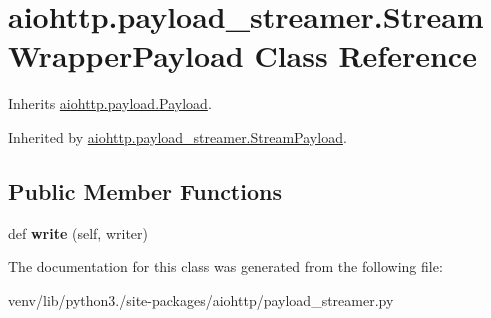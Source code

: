 \hypertarget{classaiohttp_1_1payload__streamer_1_1_stream_wrapper_payload}{}\section{aiohttp.\+payload\+\_\+streamer.\+Stream\+Wrapper\+Payload Class Reference}
\label{classaiohttp_1_1payload__streamer_1_1_stream_wrapper_payload}


Inherits \hyperlink{classaiohttp_1_1payload_1_1_payload}{aiohttp.\+payload.\+Payload}.



Inherited by \hyperlink{classaiohttp_1_1payload__streamer_1_1_stream_payload}{aiohttp.\+payload\+\_\+streamer.\+Stream\+Payload}.

\subsection*{Public Member Functions}
\begin{DoxyCompactItemize}
\item 
\mbox{\label{classaiohttp_1_1payload__streamer_1_1_stream_wrapper_payload_a281c39e00b84af6106a41daa9e4b51f9}} 
def {\bfseries write} (self, writer)
\end{DoxyCompactItemize}


The documentation for this class was generated from the following file\+:\begin{DoxyCompactItemize}
\item 
venv/lib/python3./site-\/packages/aiohttp/payload\+\_\+streamer.\+py\end{DoxyCompactItemize}
